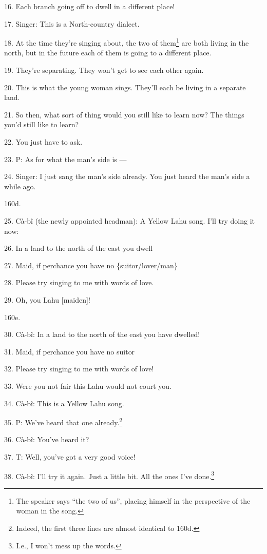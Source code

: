 16. Each branch going off to dwell in a different place!

17. Singer: This is a North-country dialect.

18. At the time they're singing about, the two of them\footnote{The speaker says ``the two of us'', placing himself in the perspective of the woman in the song.} are both living in the
north, but in the future each of them is going to a different place.

19. They're separating. They won't get to see each other again.

20. This is what the young woman sings. They'll each be living in a separate land.

21. So then, what sort of thing would you still like to learn now? The things you'd
still like to learn?

22. You just have to ask.

23. P: As for what the man's side is ---

24. Singer: I just sang the man's side already. You just heard the man's side a
while ago.

160d. 

25. Cà-bî (the newly appointed headman): A Yellow Lahu song. I'll try doing it
now: 

26. In a land to the north of the east you dwell

27. Maid, if perchance you have no \{suitor/lover/man\}

28. Please try singing to me with words of love.

29. Oh, you Lahu [maiden]!

160e. 

30. Cà-bî: In a land to the north of the east you have dwelled!

31. Maid, if perchance you have no suitor

32. Please try singing to me with words of love!

33. Were you not fair this Lahu would not court you.

34. Cà-bî: This is a Yellow Lahu song. 

35. P: We've heard that one already.\footnote{Indeed, the first three lines are almost identical to 160d.}

36. Cà-bî: You've heard it?

37. T: Well, you've got a very good voice!

38. Cà-bî: I'll try it again. Just a little bit. All the ones I've done.\footnote{I.e., I won't mess up the words.}

